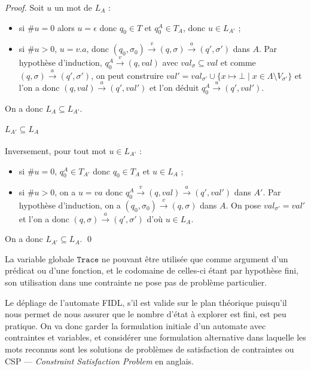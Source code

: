 \begin{proof}
Soit $u$ un mot de  $L_A$ :
\begin{itemize}
  \item si $\#u=0$ alors $u=\epsilon$ donc $q_0\in T$ et $q_0^A\in T_A$, donc
    $u\in L_{A'}$ ;
  \item  si $\#u>0$, $u=v.a$, donc $(q_0,\sigma_0) \xrightarrow{v}
      (q,\sigma) \xrightarrow{a} (q',\sigma')$ dans $A$. Par
      hypoth\`ese d'induction,  $q_0^A \xrightarrow{v}(q,val)$ avec
      $val_\sigma \subseteq val$ et comme $(q,\sigma) \xrightarrow{a}
      (q',\sigma')$, on peut construire $val'=val_{\sigma'}\cup
    \{x\mapsto \bot\mid x\in \Lambda \setminus V_{\sigma'}\}$ et l'on
      a donc $(q,val)\xrightarrow{a}(q',val')$ et l'on d\'eduit
      $q_0^A \xrightarrow{u}(q',val')$.
\end{itemize}
On a donc $L_{A} \subseteq L_{A'}$. 

\paragraph{$L_{A'}\subseteq L_{A}$}
Inversement, pour tout mot $u\in L_{A'}$ :
\begin{itemize}
  \item si $\#u=0$, $q_0^A\in T_{A'}$ donc $q_0\in T_A$ et $u\in
  L_A$ ;
\item si $\#u > 0$, on a $u=va$ donc $q_0^A \xrightarrow{v}
  (q,val) \xrightarrow{a} (q',val')$ dans $A'$. Par hypoth\`ese
  d'induction, on a $(q_0,\sigma_0) \xrightarrow{v} (q,\sigma)$ dans
  $A$. On pose $val_{\sigma'} = val'$ et l'on a donc $(q,\sigma)
  \xrightarrow{a} (q',\sigma')$ d'o\`u $u\in L_A$. 
\end{itemize}
On a donc $L_{A'} \subseteq L_{A}$.  \hfill\qed
\end{proof}

La variable globale $\mathtt{Trace}$ ne pouvant \^etre utilis\'ee que
comme argument d'un pr\'edicat ou d'une fonction, et le codomaine de
celles-ci \'etant par hypoth\`ese fini, son utilisation dans une
contrainte ne pose pas de probl\`eme particulier.
 
Le d\'epliage de l'automate \textsf{FIDL}, s'il est valide sur le
plan th\'eorique puisqu'il nous permet de nous assurer que le nombre
d'\'etat \`a explorer est fini, est peu pratique. On va donc garder
la formulation initiale d'un automate avec contraintes et variables,
et consid\'erer une formulation alternative dans laquelle les mots
reconnus sont les solutions de probl\`emes de satisfaction de
contraintes ou \textsf{CSP} --- \emph{Constraint Satisfaction Problem}
en anglais. 


